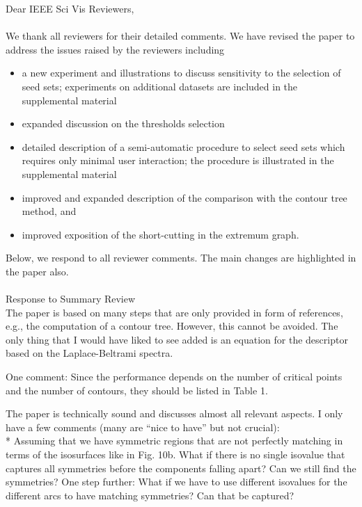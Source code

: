 \documentclass[10pt]{article}
\title{}
\date{}
\begin{document}
\noindent Dear IEEE Sci Vis Reviewers,\\\\

We thank all reviewers for their detailed comments. We have revised the paper to address the issues raised by the reviewers including 
\begin{itemize}
\item a new experiment and illustrations to discuss sensitivity to the selection of seed sets;	experiments 
	on additional datasets are included in the supplemental material
\item expanded discussion on the thresholds selection
\item detailed description of a semi-automatic procedure to select seed sets which requires only minimal 
	user interaction; the procedure is illustrated in the supplemental material
\item improved and expanded description of the comparison with the contour tree method, and
\item improved exposition of the short-cutting in the extremum graph.
\end{itemize} 
Below, we respond to all reviewer comments. The main changes are highlighted in the paper also.\\\\

{\noindent \LARGE Response to Summary Review}\\

The paper is based on many steps that are only provided in form of
   references, e.g., the computation of a contour tree. However, this cannot
   be avoided. The only thing that I would have liked to see added is an
   equation for the descriptor based on the Laplace-Beltrami spectra.


   One comment:
   Since the performance depends on the number of critical points and the
   number of contours, they should be listed in Table 1.

   The paper is technically sound and discusses almost all relevant aspects.
   I only have a few comments (many are ``nice to have'' but not crucial):\\
   * Assuming that we have symmetric regions that are not perfectly matching
   in terms of the isosurfaces like in Fig. 10b. What if there is no single
   isovalue that captures all symmetries before the components falling
   apart? Can we still find the symmetries? One step further: What if we
   have to use different isovalues for the different arcs to have matching
   symmetries? Can that be captured?\\
   
\end{document}

